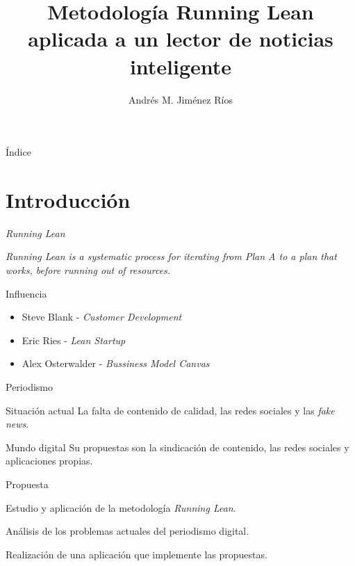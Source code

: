 \documentclass[12pt]{beamer}
\title{Metodología Running Lean aplicada a un lector de noticias inteligente}
\author{Andrés M. Jiménez Ríos}
\institute[TFM]{Trabajo Fin de Máster}
\begin{document}
	\frame{\titlepage}
	
	\begin{frame}{Índice}
		\tableofcontents
	\end{frame}

	\section{Introducción}
		\begin{frame}{\textit{Running Lean}}
			\begin{block}{}
				\textit{Running Lean is a systematic process for iterating from Plan A to a plan that works, before running out of resources.}
			\end{block}
			\begin{block}{Influencia}
				\begin{itemize}
                    \item Steve Blank - \textit{Customer Development}
                    \item Eric Ries - \textit{Lean Startup}
                    \item Alex Osterwalder - \textit{Bussiness Model Canvas}
                \end{itemize}
			\end{block}
        \end{frame}
	
		\begin{frame}{Periodismo}
			\begin{block}{Situación actual}
				La falta de contenido de calidad, las redes sociales y las \textit{fake news}.
			\end{block}
			\begin{block}{Mundo digital}
				Su propuestas son la sindicación de contenido, las redes sociales y aplicaciones propias.
			\end{block}
		\end{frame}

		\begin{frame}{Propuesta}
			\begin{block}{}
				Estudio y aplicación de la metodología \textit{Running Lean}.
			\end{block}
			\begin{block}{}
				Análisis de los problemas actuales del periodismo digital.
			\end{block}
			\begin{block}{}
				Realización de una aplicación que implemente las propuestas.
			\end{block}
		\end{frame}
\end{document}
